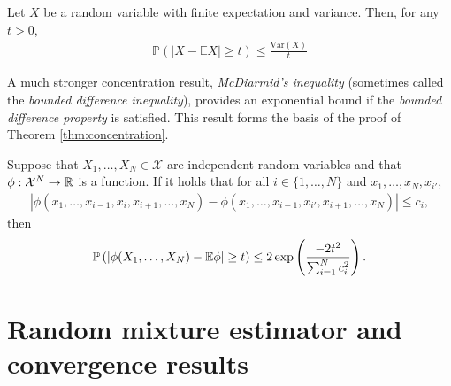 \medskip

\begin{lemma}\label{lemma:chebyshev}
Let $X$ be a random variable with finite expectation and variance. Then, for any $t>0$,
\begin{align*}
\mathbb{P}\left( |X - \mathbb{E}X | \geq t \right) \leq \frac{\mathrm{Var}(X)}{t}
\end{align*}
\end{lemma}

A much stronger concentration result, \emph{McDiarmid's inequality} (sometimes called the \emph{bounded difference	inequality}), provides an exponential bound if the \emph{bounded difference property} is satisfied.
This result forms the basis of the proof of Theorem \ref{thm:concentration}.

\medskip

\begin{theorem}\label{thm:mcdiarmid}
Suppose that $X_1, \ldots, X_N \in \mathcal{X}$ are independent random variables and that $\phi : \mathcal{X}^N \to \mathbb{R}$ is a function. 
If it holds that for all $i\in\{1,\ldots,N\}$ and $x_1, \ldots, x_N, x_{i'}$, 
\begin{align*}
    \left| \phi(x_1, \ldots, x_{i-1}, x_i, x_{i+1}, \ldots, x_N) - \phi(x_1, \ldots, x_{i-1}, x_{i'}, x_{i+1}, \ldots, x_N)\right| \leq c_i,
\end{align*}
then
\begin{align*}
    \mathbb{P} \left(|\phi(X_1,\ldots, X_N) - \mathbb{E}\phi| \geq t \right) \leq 2\exp\left(\frac{-2t^2}{\sum_{i=1}^N c^2_i} \right).
\end{align*}
\end{theorem}




\section{Random mixture estimator and convergence results}\label{sec:theory}

